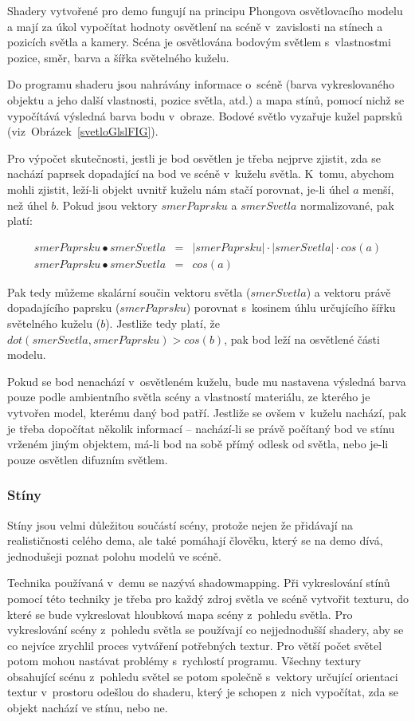 Shadery vytvořené pro demo fungují na principu Phongova osvětlovacího modelu a  mají za úkol vypočítat hodnoty osvětlení na scéně v~zavislosti na stínech a pozicích světla a kamery. 
Scéna je osvětlována bodovým světlem s~vlastnostmi pozice, směr, barva a šířka světelného kuželu.

Do programu shaderu jsou nahrávány informace o~scéně (barva vykreslovaného objektu a jeho další vlastnosti, pozice světla, atd.) a mapa stínů, pomocí nichž se vypočítává výsledná barva bodu v~obraze.
Bodové světlo vyzařuje kužel paprsků (viz~Obrázek~\ref{svetloGlslFIG}).

Pro výpočet skutečnosti, jestli je bod osvětlen je třeba nejprve zjistit, zda se nachází paprsek dopadající na bod ve scéně v~kuželu světla.
K~tomu, abychom mohli zjistit, leží-li objekt uvnitř kuželu nám stačí porovnat, je-li úhel $a$ menší, než úhel $b$.
Pokud jsou vektory $smerPaprsku$ a $smerSvetla$ normalizované, pak platí:

\begin{eqnarray}
  smerPaprsku \bullet smerSvetla & = & |smerPaprsku| \cdot |smerSvetla| \cdot cos(a) \\
  smerPaprsku \bullet smerSvetla & = & cos(a)
\end{eqnarray}

Pak tedy můžeme skalární součin vektoru světla ($smerSvetla$) a vektoru právě dopadajícího paprsku ($smerPaprsku$) porovnat s~kosinem úhlu určujícího šířku světelného kuželu ($b$).
Jestliže tedy platí, že $dot(smerSvetla, smerPaprsku) > cos(b)$, pak bod leží na osvětlené části modelu. 

Pokud se bod nenachází v~osvětleném kuželu, bude mu nastavena výsledná barva pouze podle ambientního světla scény a vlastností materiálu, ze kterého je vytvořen model, kterému daný bod patří.
Jestliže se ovšem v~kuželu nachází, pak je třeba dopočítat několik informací -- nachází-li se právě počítaný bod ve stínu vrženém jiným objektem, má-li bod na sobě přímý odlesk od světla, nebo je-li pouze osvětlen difuzním světlem.

\subsubsection{Stíny}
Stíny jsou velmi důležitou součástí scény, protože nejen že přidávají na realističnosti celého dema, ale také pomáhají člověku, který se na demo dívá, jednodušeji poznat polohu modelů ve scéně.

Technika používaná v~demu se nazývá shadowmapping.
Při vykreslování stínů pomocí této techniky je třeba pro každý zdroj světla ve scéně vytvořit texturu, do které se bude vykreslovat hloubková mapa scény z~pohledu světla.
Pro vykreslování scény z~pohledu světla se používají co nejjednodušší shadery, aby se co nejvíce zrychlil proces vytváření potřebných textur.
Pro větší počet světel potom mohou nastávat problémy s~rychlostí programu.
Všechny textury obsahující scénu z~pohledu světel se potom společně s~vektory určující orientaci textur v~prostoru odešlou do shaderu, který je schopen z~nich vypočítat, zda se objekt nachází ve stínu, nebo ne.

